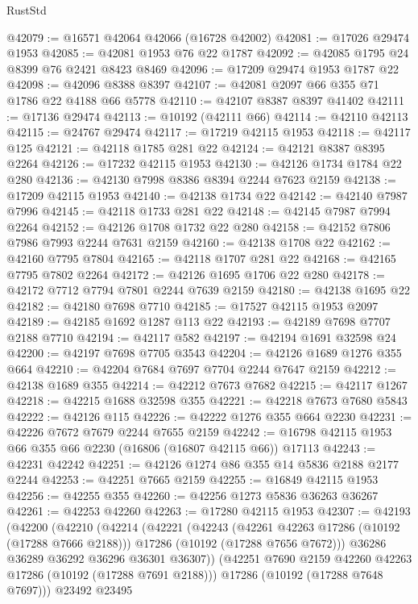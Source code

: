 \begin{lexlean}{RustStd}
\begin{coremodule}
@42079 := @16571 @42064 @42066 (@16728 @42002)
@42081 := @17026 @29474 @1953
@42085 := @42081 @1953 @76 @22 @1787
@42092 := @42085 @1795 @24 @8399 @76 @2421 @8423 @8469
@42096 := @17209 @29474 @1953 @1787 @22
@42098 := @42096 @8388 @8397
@42107 := @42081 @2097 @66 @355 @71 @1786 @22 @4188 @66 @5778
@42110 := @42107 @8387 @8397 @41402
@42111 := @17136 @29474
@42113 := @10192 (@42111 @66)
@42114 := @42110 @42113
@42115 := @24767 @29474
@42117 := @17219 @42115 @1953
@42118 := @42117 @125
@42121 := @42118 @1785 @281 @22
@42124 := @42121 @8387 @8395 @2264
@42126 := @17232 @42115 @1953
@42130 := @42126 @1734 @1784 @22 @280
@42136 := @42130 @7998 @8386 @8394 @2244 @7623 @2159
@42138 := @17209 @42115 @1953
@42140 := @42138 @1734 @22
@42142 := @42140 @7987 @7996
@42145 := @42118 @1733 @281 @22
@42148 := @42145 @7987 @7994 @2264
@42152 := @42126 @1708 @1732 @22 @280
@42158 := @42152 @7806 @7986 @7993 @2244 @7631 @2159
@42160 := @42138 @1708 @22
@42162 := @42160 @7795 @7804
@42165 := @42118 @1707 @281 @22
@42168 := @42165 @7795 @7802 @2264
@42172 := @42126 @1695 @1706 @22 @280
@42178 := @42172 @7712 @7794 @7801 @2244 @7639 @2159
@42180 := @42138 @1695 @22
@42182 := @42180 @7698 @7710
@42185 := @17527 @42115 @1953 @2097
@42189 := @42185 @1692 @1287 @113 @22
@42193 := @42189 @7698 @7707 @2188 @7710
@42194 := @42117 @582
@42197 := @42194 @1691 @32598 @24
@42200 := @42197 @7698 @7705 @3543
@42204 := @42126 @1689 @1276 @355 @664
@42210 := @42204 @7684 @7697 @7704 @2244 @7647 @2159
@42212 := @42138 @1689 @355
@42214 := @42212 @7673 @7682
@42215 := @42117 @1267
@42218 := @42215 @1688 @32598 @355
@42221 := @42218 @7673 @7680 @5843
@42222 := @42126 @115
@42226 := @42222 @1276 @355 @664 @2230
@42231 := @42226 @7672 @7679 @2244 @7655 @2159
@42242 := @16798 @42115 @1953 @66 @355 @66 @2230 (@16806 (@16807 @42115 @66)) @17113
@42243 := @42231 @42242
@42251 := @42126 @1274 @86 @355 @14 @5836 @2188 @2177 @2244
@42253 := @42251 @7665 @2159
@42255 := @16849 @42115 @1953
@42256 := @42255 @355
@42260 := @42256 @1273 @5836 @36263 @36267
@42261 := @42253 @42260
@42263 := @17280 @42115 @1953
@42307 := @42193
    (@42200
      (@42210
        (@42214
          (@42221
            (@42243
              (@42261 @42263 @17286 (@10192 (@17288 @7666 @2188)))
              @17286
              (@10192 (@17288 @7656 @7672)))
            @36286
            @36289
            @36292
            @36296
            @36301
            @36307))
        (@42251 @7690 @2159 @42260 @42263 @17286 (@10192 (@17288 @7691 @2188)))
        @17286
        (@10192 (@17288 @7648 @7697)))
      @23492
      @23495

\end{coremodule}
\end{lexlean}
